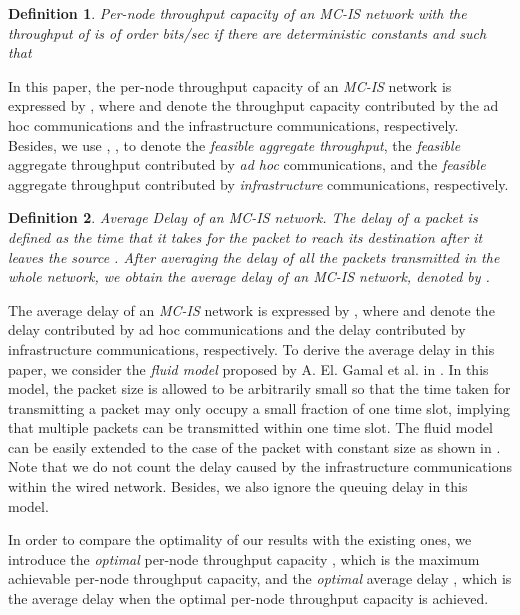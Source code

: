 \documentclass[10pt,journal]{IEEEtran}
\newtheorem{definition}{Definition}
\begin{document}
\begin{definition}
\textit{Per-node throughput capacity of an \textit{MC-IS} network} with the throughput of  is of order  bits/sec if there are deterministic constants  and  such that

\end{definition} 

In this paper, the per-node throughput capacity of an \textit{MC-IS} network is expressed by , where  and  denote the throughput capacity contributed by the ad hoc communications and the infrastructure communications, respectively. Besides, we use , ,  to denote the \textit{feasible aggregate throughput}, the \textit{feasible} aggregate throughput contributed by \textit{ad hoc} communications, and the \textit{feasible} aggregate throughput contributed by \textit{infrastructure} communications, respectively.

\begin{definition}
\textit{Average Delay of an \textit{MC-IS} network}. The \textit{delay of a packet} is defined as the time that it takes for the packet to reach its destination after it leaves the source \cite{gamal:TIT2006}. After averaging the delay of all the packets transmitted in the whole network, we obtain the \textit{average delay} of an \textit{MC-IS} network, denoted by .
\end{definition}

The average delay of an \emph{MC-IS} network is expressed by , where  and  denote the delay contributed by ad hoc communications and the delay contributed by infrastructure communications, respectively. To derive the average delay in this paper, we consider the {\it fluid model} proposed by A. El. Gamal et al. in \cite{gamal:2004,gamal:TIT2006}. In this model, the packet size is allowed to be arbitrarily small so that the time taken for transmitting a packet may only occupy a small fraction of one time slot, implying that multiple packets can be transmitted within one time slot. The fluid model can be easily extended to the case of the packet with constant size as shown in \cite{gamal:TIT2006II}. Note that we do not count the delay caused by the infrastructure communications within the wired network. Besides, we also ignore the queuing delay in this model.

In order to compare the optimality of our results with the existing ones, we introduce the \emph{optimal} per-node throughput capacity , which is the maximum achievable per-node throughput capacity, and the \emph{optimal} average delay , which is the average delay when the optimal per-node throughput capacity  is achieved. 
\end{document}
